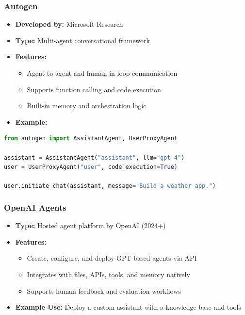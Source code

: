 \begin{frame}[fragile]\frametitle{Autogen}
    \begin{itemize}
        \item \textbf{Developed by:} Microsoft Research
        \item \textbf{Type:} Multi-agent conversational framework
        \item \textbf{Features:}
              \begin{itemize}
                  \item Agent-to-agent and human-in-loop communication
                  \item Supports function calling and code execution
                  \item Built-in memory and orchestration logic
              \end{itemize}
        \item \textbf{Example:}
    \end{itemize}
\begin{lstlisting}[language=Python]
from autogen import AssistantAgent, UserProxyAgent

assistant = AssistantAgent("assistant", llm="gpt-4")
user = UserProxyAgent("user", code_execution=True)

user.initiate_chat(assistant, message="Build a weather app.")
\end{lstlisting}
\end{frame}

\begin{frame}[fragile]\frametitle{OpenAI Agents}
    \begin{itemize}
        \item \textbf{Type:} Hosted agent platform by OpenAI (2024+)
        \item \textbf{Features:}
              \begin{itemize}
                  \item Create, configure, and deploy GPT-based agents via API
                  \item Integrates with files, APIs, tools, and memory natively
                  \item Supports human feedback and evaluation workflows
              \end{itemize}
        \item \textbf{Example Use:} Deploy a custom assistant with a knowledge base and tools
    \end{itemize}
\end{frame}

